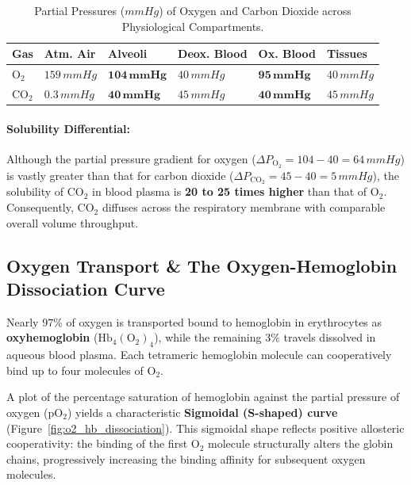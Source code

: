 \documentclass[10pt,twoside,openright]{book}
\begin{document}
\begin{table}[htbp]
\centering
\footnotesize
\setlength{\tabcolsep}{2.5pt}
\renewcommand{\arraystretch}{1.2}
\begin{tabularx}{\textwidth}{|l|Y|Y|Y|Y|Y|}
\hline
\textbf{Gas} & \textbf{Atm. Air} & \textbf{Alveoli} & \textbf{Deox. Blood} & \textbf{Ox. Blood} & \textbf{Tissues} \\
\hline
$\mathbf{\mathrm{O_2}}$ & $159\,\si{mmHg}$ & $\mathbf{104\,\si{mmHg}}$ & $40\,\si{mmHg}$ & $\mathbf{95\,\si{mmHg}}$ & $40\,\si{mmHg}$ \\
$\mathbf{\mathrm{CO_2}}$ & $0.3\,\si{mmHg}$ & $\mathbf{40\,\si{mmHg}}$ & $45\,\si{mmHg}$ & $\mathbf{40\,\si{mmHg}}$ & $45\,\si{mmHg}$ \\
\hline
\end{tabularx}
\caption{Partial Pressures ($\si{mmHg}$) of Oxygen and Carbon Dioxide across Physiological Compartments.}
\label{tab:respiratory_partial_pressures}
\end{table}

\paragraph{Solubility Differential:} Although the partial pressure gradient for oxygen ($\Delta P_{\mathrm{O_2}} = 104 - 40 = 64\,\si{mmHg}$) is vastly greater than that for carbon dioxide ($\Delta P_{\mathrm{CO_2}} = 45 - 40 = 5\,\si{mmHg}$), the solubility of $\mathrm{CO}_2$ in blood plasma is \textbf{20 to 25 times higher} than that of $\mathrm{O}_2$. Consequently, $\mathrm{CO}_2$ diffuses across the respiratory membrane with comparable overall volume throughput.

\subsection{Oxygen Transport \& The Oxygen-Hemoglobin Dissociation Curve}
Nearly $97\%$ of oxygen is transported bound to hemoglobin in erythrocytes as \textbf{oxyhemoglobin} ($\mathrm{Hb_4(O_2)_4}$), while the remaining $3\%$ travels dissolved in aqueous blood plasma. Each tetrameric hemoglobin molecule can cooperatively bind up to four molecules of $\mathrm{O}_2$.

A plot of the percentage saturation of hemoglobin against the partial pressure of oxygen ($\mathrm{pO_2}$) yields a characteristic \textbf{Sigmoidal (S-shaped) curve} (Figure~\ref{fig:o2_hb_dissociation}). This sigmoidal shape reflects positive allosteric cooperativity: the binding of the first $\mathrm{O}_2$ molecule structurally alters the globin chains, progressively increasing the binding affinity for subsequent oxygen molecules.
\end{document}
